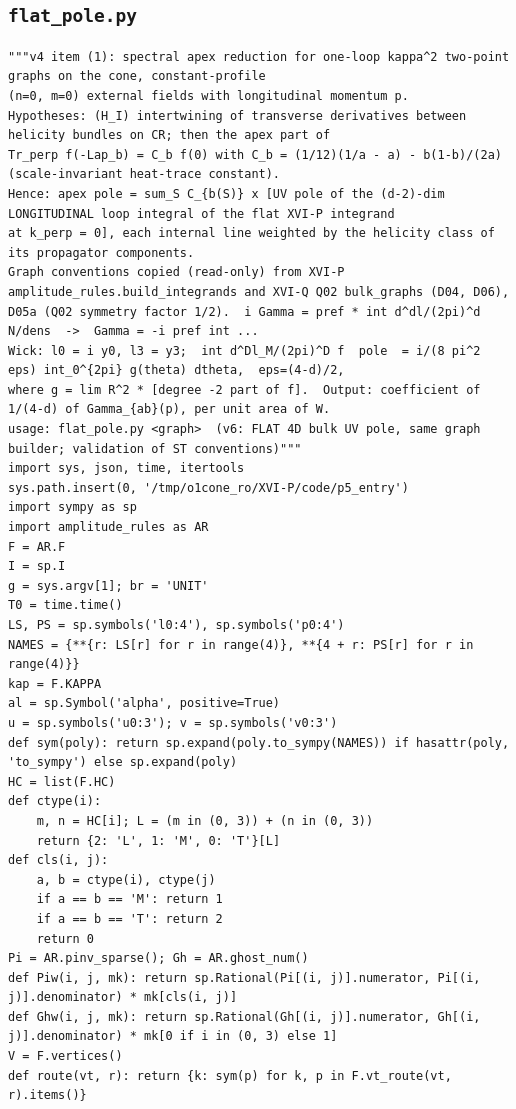 \documentclass[10pt]{article}
\begin{document}
\subsection{\texttt{flat\_pole.py}}
\begin{lstlisting}
"""v4 item (1): spectral apex reduction for one-loop kappa^2 two-point graphs on the cone, constant-profile
(n=0, m=0) external fields with longitudinal momentum p.
Hypotheses: (H_I) intertwining of transverse derivatives between helicity bundles on CR; then the apex part of
Tr_perp f(-Lap_b) = C_b f(0) with C_b = (1/12)(1/a - a) - b(1-b)/(2a)  (scale-invariant heat-trace constant).
Hence: apex pole = sum_S C_{b(S)} x [UV pole of the (d-2)-dim LONGITUDINAL loop integral of the flat XVI-P integrand
at k_perp = 0], each internal line weighted by the helicity class of its propagator components.
Graph conventions copied (read-only) from XVI-P amplitude_rules.build_integrands and XVI-Q Q02 bulk_graphs (D04, D06),
D05a (Q02 symmetry factor 1/2).  i Gamma = pref * int d^dl/(2pi)^d N/dens  ->  Gamma = -i pref int ...
Wick: l0 = i y0, l3 = y3;  int d^Dl_M/(2pi)^D f  pole  = i/(8 pi^2 eps) int_0^{2pi} g(theta) dtheta,  eps=(4-d)/2,
where g = lim R^2 * [degree -2 part of f].  Output: coefficient of 1/(4-d) of Gamma_{ab}(p), per unit area of W.
usage: flat_pole.py <graph>  (v6: FLAT 4D bulk UV pole, same graph builder; validation of ST conventions)"""
import sys, json, time, itertools
sys.path.insert(0, '/tmp/o1cone_ro/XVI-P/code/p5_entry')
import sympy as sp
import amplitude_rules as AR
F = AR.F
I = sp.I
g = sys.argv[1]; br = 'UNIT'
T0 = time.time()
LS, PS = sp.symbols('l0:4'), sp.symbols('p0:4')
NAMES = {**{r: LS[r] for r in range(4)}, **{4 + r: PS[r] for r in range(4)}}
kap = F.KAPPA
al = sp.Symbol('alpha', positive=True)
u = sp.symbols('u0:3'); v = sp.symbols('v0:3')
def sym(poly): return sp.expand(poly.to_sympy(NAMES)) if hasattr(poly, 'to_sympy') else sp.expand(poly)
HC = list(F.HC)
def ctype(i):
    m, n = HC[i]; L = (m in (0, 3)) + (n in (0, 3))
    return {2: 'L', 1: 'M', 0: 'T'}[L]
def cls(i, j):
    a, b = ctype(i), ctype(j)
    if a == b == 'M': return 1
    if a == b == 'T': return 2
    return 0
Pi = AR.pinv_sparse(); Gh = AR.ghost_num()
def Piw(i, j, mk): return sp.Rational(Pi[(i, j)].numerator, Pi[(i, j)].denominator) * mk[cls(i, j)]
def Ghw(i, j, mk): return sp.Rational(Gh[(i, j)].numerator, Gh[(i, j)].denominator) * mk[0 if i in (0, 3) else 1]
V = F.vertices()
def route(vt, r): return {k: sym(p) for k, p in F.vt_route(vt, r).items()}

\end{lstlisting}
\end{document}
